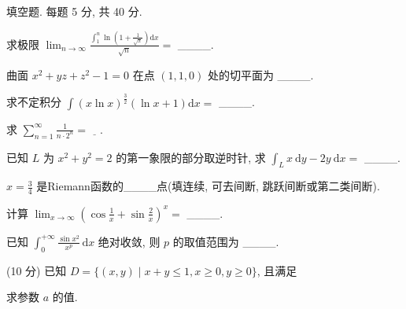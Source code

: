 \par{}
填空题. 每题 5 分, 共 40 分.\par
求极限  $\lim_{n\to\infty}\frac{\int_{1}^{n}\ln\left(1+\frac{1}{\sqrt{x}}\right)\mathrm{d}x}{\sqrt{n}}=$  \_\_\_\_.\par
曲面 $x^{2} + yz + z^{2} - 1 = 0$ 在点 $(1,1,0)$ 处的切平面为 \_\_\_\_.\par
求不定积分  $\int(x\ln x)^{\frac{3}{2}}(\ln x+1)\mathrm{d}x=$  \_\_\_\_.\par
求 $\sum_{n=1}^{\infty} \frac{1}{n \cdot 2^n} = \underline{\quad}$.\par
已知 $L$ 为 $x^{2} + y^{2} = 2$ 的第一象限的部分取逆时针, 求 $\int_{L} x \mathrm{~d}y - 2y \mathrm{~d}x =$ \_\_\_\_.\par
$x = \frac{3}{4}$ 是Riemann函数的\_\_\_\_点(填连续, 可去间断, 跳跃间断或第二类间断).\par
计算 $\lim_{x\to \infty}\left(\cos \frac{1}{x} +\sin \frac{2}{x}\right)^x =$ \_\_\_\_.\par
已知 $\int_0^{+\infty} \frac{\sin x^2}{x^p} \, \mathrm{d}x$ 绝对收敛, 则 $p$ 的取值范围为 \_\_\_\_.\par
\par{}
\par{}
(10 分) 已知 $D = \{(x, y) \mid x + y \leq 1, x \geq 0, y \geq 0\}$, 且满足\par
\nopagebreak[4]
求参数 $a$ 的值.\par
